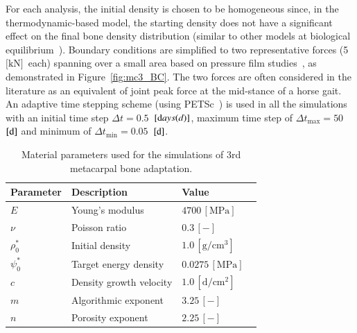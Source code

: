 \documentclass[review]{elsarticle}
\numberwithin{equation}{section}
\begin{document}
For each analysis, the initial density is chosen to be homogeneous since, in the thermodynamic-based model, the starting density does not have a significant effect on the final bone density distribution (similar to other models at biological equilibrium~\citep{kuhl2003theory}). %
Boundary conditions are simplified to two representative forces (5~$\text{[kN]}$~each) spanning over a small area based on pressure film studies~\citep{Brama2001}, as demonstrated in Figure~\ref{fig:mc3_BC}. 
The two forces are often considered in the literature as an equivalent of joint peak force at the mid-stance of a horse gait. %
An adaptive time stepping scheme (using PETSc~\citep{petsc-web}) is used in all the simulations with an initial time step $\Delta t = 0.5$~$[\text days (d)]$, maximum time step of $\Delta t_{\text {max}} = 50$~$[\text d]$ and minimum of $\Delta t_{\text {min}} = 0.05$~$[\text d]$.
\begin{table}[h]
	\centering
	\begin{tabular}{lll}
		\hline
		Parameter             & Description                  & Value  \\ \hline
		$E  $                 & Young's modulus              & $4700 \,\mathrm{ [MPa]}$ ~\citep{Les1994} \\
		$\nu  $               & Poisson ratio                & $0.3 \,\mathrm{ [-]}$ \\
		$\rho_0 ^\ast  $      & Initial density              & $1.0 \,\mathrm{[ g/cm^{3}]}$  \\
		$\psi_{0}^\ast $      & Target energy density        & $0.0275\,\mathrm{ [MPa]}$  ~\citep{Waffenschmidt2012}  \\
		$c$                   & Density growth velocity      & $1.0 \,\mathrm{ [d/cm^{2}]}$   \\
		$m$                   & Algorithmic exponent         & $ 3.25 \,\mathrm{ [-]}$          \\
		$n$                   & Porosity exponent            & $2.25 \,\mathrm{ [-]}$     ~\citep{Les1994}   \\ 
		\hline
	\end{tabular} 
	\caption{Material parameters used for the simulations of 3rd metacarpal bone adaptation.}
	\label{tab:parameters_mc3}
\end{table}
\end{document}
